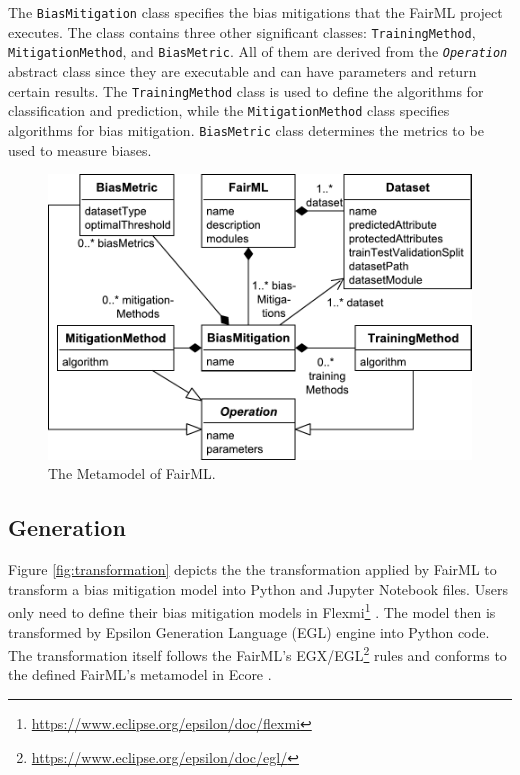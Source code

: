 \documentclass[sigconf,review]{acmart}
\begin{document}
The \texttt{BiasMitigation} class specifies the bias mitigations that the FairML project executes. The class contains three other significant classes: \texttt{TrainingMethod}, \texttt{MitigationMethod}, and \texttt{BiasMetric}. All of them are derived from the \texttt{\textit{Operation}} abstract class since they are executable and can have parameters and return certain results. The \texttt{TrainingMethod} class is used to define the algorithms for classification and prediction, while the \texttt{MitigationMethod} class specifies algorithms for bias mitigation. \texttt{BiasMetric} class determines the metrics to be used to measure biases. 

\begin{figure}
	\includegraphics[width=\linewidth]{figures/metamodel}
	\caption{The Metamodel of FairML.}
	\label{fig:metamodel}
\end{figure}

\subsection{Generation}
\label{sec:generation}

Figure \ref{fig:transformation} depicts the the transformation applied by FairML to transform a bias mitigation model into Python and Jupyter Notebook files. Users only need to define their bias mitigation models in Flexmi\footnote{\url{https://www.eclipse.org/epsilon/doc/flexmi}} \cite{dimitris2016flexmi}. The model then is transformed by Epsilon Generation Language (EGL) \cite{rose2008egl} engine into Python code. The transformation itself follows the FairML's EGX/EGL\footnote{\url{https://www.eclipse.org/epsilon/doc/egl/}} rules and conforms to the defined FairML's metamodel in Ecore \cite{steinberg2009emf}.  
\end{document}
